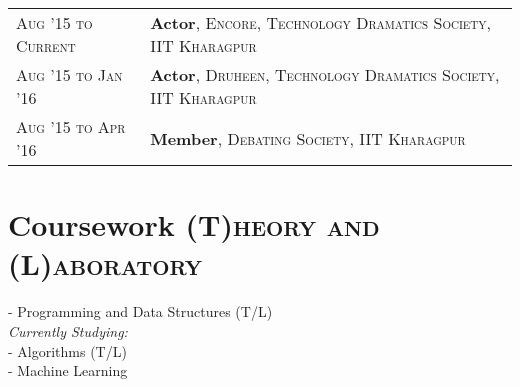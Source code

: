 \documentclass[a4paper,11pt]{extarticle} %
\begin{document}
\begin{tabular}{R{3.5cm}|p{14.5cm}}
\textsc{Aug '15 to Current} & \textbf{Actor}, \textsc{Encore, Technology Dramatics Society, IIT Kharagpur} \\
\textsc{Aug '15 to Jan '16} & \textbf{Actor}, \textsc{Druheen, Technology Dramatics Society, IIT Kharagpur} \\
\textsc{Aug '15 to Apr '16} & \textbf{Member}, \textsc{Debating Society, IIT Kharagpur} \\
\end{tabular}



\section{Coursework
\hfill\small\textsc{(T)heory and (L)aboratory}}

{\hspace{0.5cm}- Programming and Data Structures (T/L)}
\\
{\hspace*{0.5cm} \itshape{Currently Studying:}}
\\
{\hspace*{0.5cm}- Algorithms (T/L)}\\
{\hspace*{0.5cm}- Machine Learning }
\end{document}
